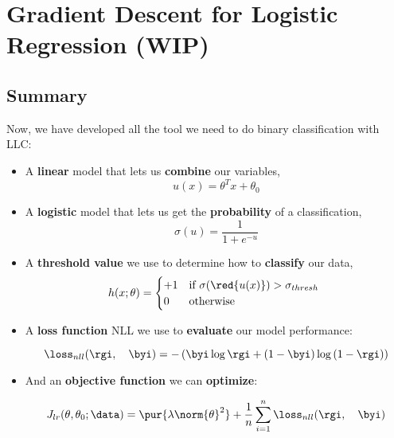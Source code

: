 
\section*{Gradient Descent for Logistic Regression (WIP)}

    \subsection*{Summary}
    
    Now, we have developed all the tool we need to do binary classification with LLC:
    
    \begin{itemize}
        \item A \textbf{linear} model that lets us \textbf{combine} our variables,
            \begin{equation}
                u(x) = \theta^T x + \theta_0
            \end{equation}
            
        \item A \textbf{logistic} model that lets us get the \textbf{probability} of a classification,
            \begin{equation}
                \sigma(u) = \frac{1}{1+e^{-u}}
            \end{equation}
            
        \item A \textbf{threshold value} we use to determine how to \textbf{classify} our data,
            \begin{equation}
                h(x; \theta) = 
                \begin{cases}
                    +1 & \text{if $\sigma(\red{u(x)})>\sigma_{thresh}$ }\\
                    0 & \text{otherwise}
                \end{cases}
            \end{equation}
            
        \item A \textbf{loss function} NLL we use to \textbf{evaluate} our model performance:
        
            \begin{equation*}
                \loss_{nll}
                (\rgi ,\quad \byi)
                =
                -
                \left(
                    \byi \log{\rgi}
                    +
                    \left( 1 - \byi \right)
                    \log
                    \left( 1-\rgi \right) 
                \right)
            \end{equation*}
            
        \item And an \textbf{objective function} we can \textbf{optimize}:
        
            \begin{equation}
                J_{lr}(\theta,\theta_0;\data)
                =
                \pur{ \lambda \norm{\theta}^2 }
                +
                \frac{1}{n} \sum_{i=1}^n 
                    \loss_{nll}(\rgi ,\quad \byi)
            \end{equation}
    \end{itemize}
    
